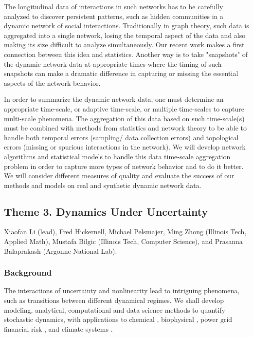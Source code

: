 \documentclass[11pt]{NSFamsart}
\begin{document}
The longitudinal data of interactions in such networks has to be carefully analyzed to discover persistent patterns, such as hidden communities in a dynamic network of social interactions. Traditionally in graph theory, such data is aggregated into a single network, losing the temporal aspect of the data and also making its size difficult to analyze simultaneously. Our recent work \cite{tergms} makes a first connection between this idea and statistics. Another way is to take "snapshots" of the dynamic network data at appropriate times where the timing of such snapshots can make a dramatic difference in capturing or missing the essential aspects of the network behavior. 

In order to summarize the dynamic network data, one must determine an appropriate time-scale, or adaptive time-scale, or multiple time-scales to capture multi-scale phenomena. The aggregation of this data based on such time-scale(s) must be combined with methods from statistics and network theory to be able to handle both temporal errors (sampling/ data collection errors) and topological errors (missing or spurious interactions in the network).  We will develop network algorithms and statistical models to handle this data time-scale aggregation problem in order to capture more types of network behavior and to do it better.  We will  consider different measures of quality and evaluate the success of our methods and models on  real and synthetic dynamic network data.






\subsection*{Theme 3. Dynamics  Under Uncertainty } 
Xiaofan Li (lead), Fred Hickernell, Michael Pelsmajer, Ming Zhong (Illinois Tech, Applied Math), Mustafa Bilgic (Illinois Tech, Computer Science),  and Prasanna Balaprakash (Argonne National Lab). 

\subsubsection*{Background} The interactions of uncertainty and nonlinearity lead to intriguing phenomena, such as  transitions between  different dynamical regimes. We shall develop modeling, analytical, computational and data science  methods to quantify stochastic dynamics, with applications to chemical \cite{agaoglou_chemical_2019}, biophysical \cite{Ruoff2018BiologicalCR}, power grid \cite{MEDJROUBI201714} financial risk \cite{DixHaBil20a,Gla03}, and climate systems \cite{Alexandrov2020NonlinearCD, Franzke2017NonlinearAS, Wan2020ADF}. 
 
\end{document}
